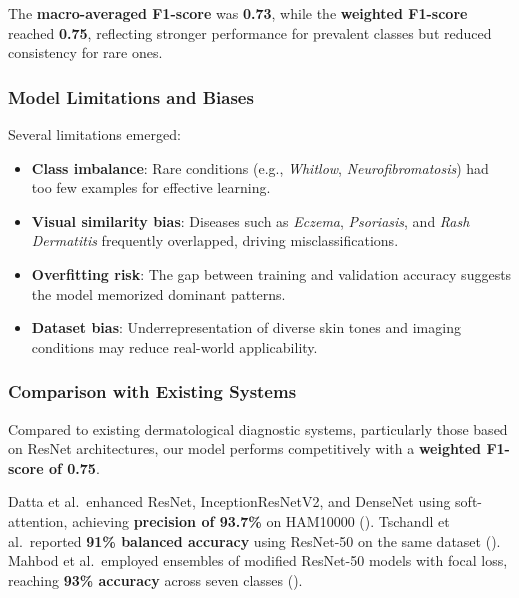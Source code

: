 \documentclass[
  12pt,
  oneside]{article}
\providecommand{\tightlist}{%
  \setlength{\itemsep}{0pt}\setlength{\parskip}{0pt}}
\begin{document}
The \textbf{macro-averaged F1-score} was \textbf{0.73}, while the
\textbf{weighted F1-score} reached \textbf{0.75}, reflecting stronger
performance for prevalent classes but reduced consistency for rare ones.

\newpage

\subsubsection{Model Limitations and
Biases}\label{model-limitations-and-biases}

Several limitations emerged:

\begin{itemize}
\tightlist
\item
  \textbf{Class imbalance}: Rare conditions (e.g., \emph{Whitlow},
  \emph{Neurofibromatosis}) had too few examples for effective
  learning.\\
\item
  \textbf{Visual similarity bias}: Diseases such as \emph{Eczema},
  \emph{Psoriasis}, and \emph{Rash Dermatitis} frequently overlapped,
  driving misclassifications.\\
\item
  \textbf{Overfitting risk}: The gap between training and validation
  accuracy suggests the model memorized dominant patterns.\\
\item
  \textbf{Dataset bias}: Underrepresentation of diverse skin tones and
  imaging conditions may reduce real-world applicability.
\end{itemize}

\subsubsection{Comparison with Existing
Systems}\label{comparison-with-existing-systems}

Compared to existing dermatological diagnostic systems, particularly
those based on ResNet architectures, our model performs competitively
with a \textbf{weighted F1-score of 0.75}.

Datta et al.~enhanced ResNet, InceptionResNetV2, and DenseNet using
soft-attention, achieving \textbf{precision of 93.7\%} on HAM10000
(). Tschandl et
al.~reported \textbf{91\% balanced accuracy} using ResNet-50 on the same
dataset ().
Mahbod et al.~employed ensembles of modified ResNet-50 models with focal
loss, reaching \textbf{93\% accuracy} across seven classes
().
\end{document}
